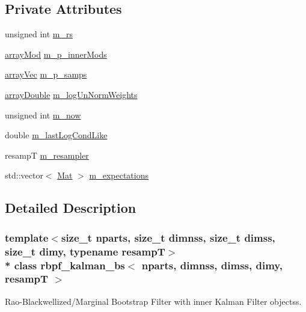 \subsection*{Private Attributes}
\begin{DoxyCompactItemize}
\item 
unsigned int \hyperlink{classrbpf__kalman__bs_a6d86ffa1e023e3cdcd429fe035c08cfd}{m\+\_\+rs}
\item 
\hyperlink{classrbpf__kalman__bs_aa7f8e240e96a4272142f3d60fbd0d007}{array\+Mod} \hyperlink{classrbpf__kalman__bs_a5476616a6294961cacb9aa82bcf5cfd6}{m\+\_\+p\+\_\+inner\+Mods}
\item 
\hyperlink{classrbpf__kalman__bs_aad6c02f9c5db3937db418d3fc80deb4d}{array\+Vec} \hyperlink{classrbpf__kalman__bs_a763eb2ce41bc321803f89b78b732573f}{m\+\_\+p\+\_\+samps}
\item 
\hyperlink{classrbpf__kalman__bs_a4f03888e8fc3a8c9402bde23823561de}{array\+Double} \hyperlink{classrbpf__kalman__bs_ab5cfe5ba161d08d86946f783ade20883}{m\+\_\+log\+Un\+Norm\+Weights}
\item 
unsigned int \hyperlink{classrbpf__kalman__bs_abbb78e54b0077e126cb5816ede57b9a0}{m\+\_\+now}
\item 
double \hyperlink{classrbpf__kalman__bs_a1a4253dd9ee0f096e7ca65ca98529301}{m\+\_\+last\+Log\+Cond\+Like}
\item 
resampT \hyperlink{classrbpf__kalman__bs_aaadb68075e736f9eca8925623020aaba}{m\+\_\+resampler}
\item 
std\+::vector$<$ \hyperlink{classrbpf__kalman__bs_a070b7a6225d1eae7595454fb523fd182}{Mat} $>$ \hyperlink{classrbpf__kalman__bs_aec5b9e4300e3549007c5a4285557b013}{m\+\_\+expectations}
\end{DoxyCompactItemize}


\subsection{Detailed Description}
\subsubsection*{template$<$size\+\_\+t nparts, size\+\_\+t dimnss, size\+\_\+t dimss, size\+\_\+t dimy, typename resampT$>$\\*
class rbpf\+\_\+kalman\+\_\+bs$<$ nparts, dimnss, dimss, dimy, resamp\+T $>$}

Rao-\/\+Blackwellized/\+Marginal Bootstrap Filter with inner Kalman Filter objectss. 

